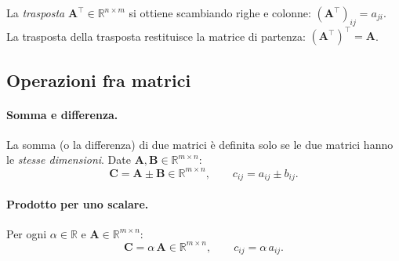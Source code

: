 La \textit{trasposta} $\bm{A}^\top \in \mathbb{R}^{n \times m}$ si ottiene
scambiando righe e colonne: $(\bm{A}^\top)_{ij} = a_{ji}$.  La trasposta della trasposta restituisce la matrice di partenza:
$(\bm{A}^\top)^\top = \bm{A}$. 


\subsection{Operazioni fra matrici}

\paragraph{Somma e differenza.}
La somma (o la differenza) di due matrici \`e definita solo se le due matrici hanno le \textit{stesse dimensioni}. Date $\bm{A}, \bm{B} \in \mathbb{R}^{m \times n}$:
\begin{equation}
	\bm{C} = \bm{A} \pm \bm{B} \in \mathbb{R}^{m \times n}, \qquad c_{ij} = a_{ij} \pm b_{ij}.
\end{equation}

\paragraph{Prodotto per uno scalare.}
Per ogni $\alpha \in \mathbb{R}$ e $\bm{A} \in \mathbb{R}^{m \times n}$:
\begin{equation}
	\bm{C} = \alpha\,\bm{A} \in \mathbb{R}^{m \times n}, \qquad c_{ij} = \alpha\, a_{ij}.
\end{equation}


